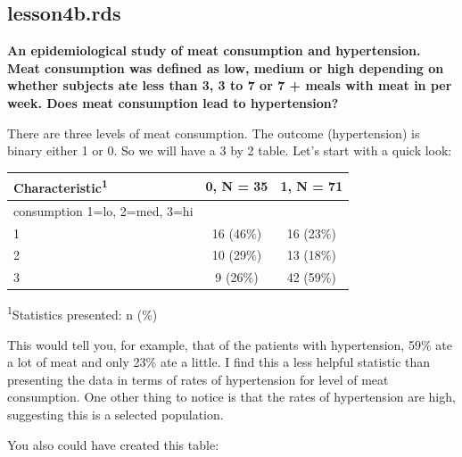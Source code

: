 \documentclass[]{book}
\newenvironment{Shaded}{\begin{snugshade}}{\end{snugshade}}
\newcommand{\DataTypeTok}[1]{\textcolor[rgb]{0.13,0.29,0.53}{#1}}
\newcommand{\KeywordTok}[1]{\textcolor[rgb]{0.13,0.29,0.53}{\textbf{#1}}}
\newcommand{\NormalTok}[1]{#1}
\newcommand{\OperatorTok}[1]{\textcolor[rgb]{0.81,0.36,0.00}{\textbf{#1}}}
\newcommand{\StringTok}[1]{\textcolor[rgb]{0.31,0.60,0.02}{#1}}
\begin{document}
\hypertarget{lesson4b.rds}{%
\subsection{lesson4b.rds}\label{lesson4b.rds}}

\textbf{An epidemiological study of meat consumption and hypertension.
Meat consumption was defined as low, medium or high depending on whether
subjects ate less than 3, 3 to 7 or 7 + meals with meat in per week.
Does meat consumption lead to hypertension?}

There are three levels of meat consumption. The outcome (hypertension)
is binary either 1 or 0. So we will have a 3 by 2 table. Let's start
with a quick look:

\begin{Shaded}
\end{Shaded}

\captionsetup[table]{labelformat=empty,skip=1pt}
\begin{longtable}{lcc}
\toprule
\textbf{Characteristic}\textsuperscript{1} & \textbf{0}, N = 35 & \textbf{1}, N = 71 \\ 
\midrule
consumption 1=lo, 2=med, 3=hi &  &  \\ 
1 & 16 (46\%) & 16 (23\%) \\ 
2 & 10 (29\%) & 13 (18\%) \\ 
3 & 9 (26\%) & 42 (59\%) \\ 
\bottomrule
\end{longtable}
\vspace{-5mm}
\begin{minipage}{\linewidth}
\textsuperscript{1}Statistics presented: n (\%) \\ 
\end{minipage}

This would tell you, for example, that of the patients with
hypertension, 59\% ate a lot of meat and only 23\% ate a little. I find
this a less helpful statistic than presenting the data in terms of rates
of hypertension for level of meat consumption. One other thing to notice
is that the rates of hypertension are high, suggesting this is a
selected population.

You also could have created this table:
\end{document}
